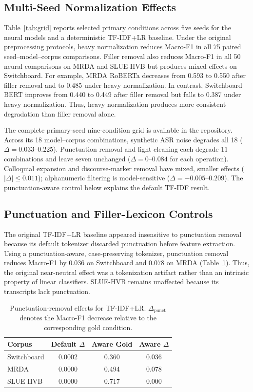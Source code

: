 \documentclass[conference]{IEEEtran}
\begin{document}
\subsection{Multi-Seed Normalization Effects}

Table~\ref{tab:grid} reports selected primary conditions
across five seeds
for the neural models and a deterministic TF-IDF+LR
baseline. Under the original preprocessing protocols,
heavy normalization reduces Macro-F1 in all 75 paired
seed--model--corpus comparisons. Filler removal also
reduces Macro-F1 in all 50 neural comparisons on MRDA
and SLUE-HVB but produces mixed effects on Switchboard.
For example, MRDA RoBERTa decreases from 0.593 to
0.550 after filler removal and to 0.485 under heavy
normalization. In contrast, Switchboard BERT improves
from 0.440 to 0.449 after filler removal but falls
to 0.387 under heavy normalization. Thus, heavy
normalization produces more consistent degradation
than filler removal alone.

The complete primary-seed nine-condition grid is
available in the repository. Across its 18
model--corpus combinations, synthetic ASR noise
degrades all 18 ($\Delta=0.033$--$0.225$).
Punctuation removal and light cleaning each degrade
11 combinations and leave seven unchanged
($\Delta=0$--$0.084$ for each operation).
Colloquial expansion and discourse-marker removal
have mixed, smaller effects ($|\Delta|\leq0.011$);
alphanumeric filtering is model-sensitive
($\Delta=-0.005$--$0.209$). The punctuation-aware
control below explains the default TF-IDF result.


\subsection{Punctuation and Filler-Lexicon Controls}

The original TF-IDF+LR baseline appeared insensitive
to punctuation removal because its default tokenizer
discarded punctuation before feature extraction.
Using a punctuation-aware, case-preserving tokenizer,
punctuation removal reduces Macro-F1 by 0.036 on
Switchboard and 0.078 on MRDA (Table~\ref{tab:punct}).
Thus, the original near-neutral effect was a
tokenization artifact rather than an intrinsic
property of linear classifiers. SLUE-HVB remains
unaffected because its transcripts lack punctuation.

\begin{table}[t]
\caption{Punctuation-removal effects for TF-IDF+LR.
$\Delta_{\mathrm{punct}}$ denotes the Macro-F1 decrease
relative to the corresponding gold condition.}
\label{tab:punct}
\centering
\scriptsize
\setlength{\tabcolsep}{4pt}
\begin{tabular}{@{}lccc@{}}
\toprule
\textbf{Corpus} &
\textbf{Default $\Delta$} &
\textbf{Aware Gold} &
\textbf{Aware $\Delta$} \\
\midrule
Switchboard & 0.0002 & 0.360 & 0.036 \\
MRDA        & 0.0000 & 0.494 & 0.078 \\
SLUE-HVB    & 0.0000 & 0.717 & 0.000 \\
\bottomrule
\end{tabular}
\end{table}
\end{document}
